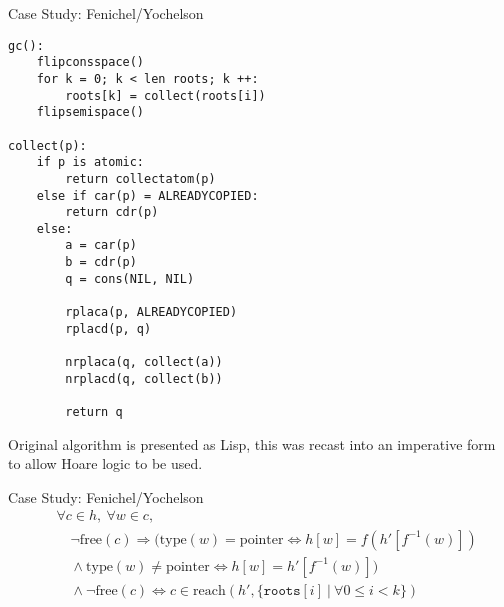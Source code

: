 \documentclass[usenames,dvipsnames]{beamer}
\renewcommand{\iff}{\Leftrightarrow}
\renewcommand{\implies}{\Rightarrow}
\newcommand{\reach}[2]{\mathrm{reach}\left(#1, #2\right)}
\newcommand{\free}[1]{\mathrm{free}\left(#1\right)}
\newcommand{\type}[1]{\mathrm{type}\left(#1\right)}
\newcommand{\typointer}{\mathrm{pointer}}
\begin{document}
\begin{frame}[fragile]{Case Study: Fenichel/Yochelson}
  \begin{lstlisting}
gc():
    flipconsspace()
    for k = 0; k < len roots; k ++:
        roots[k] = collect(roots[i])
    flipsemispace()

collect(p):
    if p is atomic:
        return collectatom(p)
    else if car(p) = ALREADYCOPIED:
        return cdr(p)
    else:
        a = car(p)
        b = cdr(p)
        q = cons(NIL, NIL)

        rplaca(p, ALREADYCOPIED)
        rplacd(p, q)

        nrplaca(q, collect(a))
        nrplacd(q, collect(b))

        return q
  \end{lstlisting}

  Original algorithm is presented as Lisp, this was recast into an
  imperative form to allow Hoare logic to be used.


\end{frame}

\begin{frame}[fragile]{Case Study: Fenichel/Yochelson}
  \begin{align*}
    &\forall c \in h,\ \forall w \in c,\\\
    &\quad\lnot\free{c} \implies (\type{w} = \typointer \iff h[w] = f(h'[f^{-1}(w)])\\
    &\quad\land \type{w} \neq \typointer \iff h[w] = h'[f^{-1}(w)])\\
    &\quad\land \lnot\free{c} \iff c \in \reach{h'}{\{\mathtt{roots}[i]~|~\forall 0 \leq i < k\}}
  \end{align*}

\end{frame}
\end{document}
